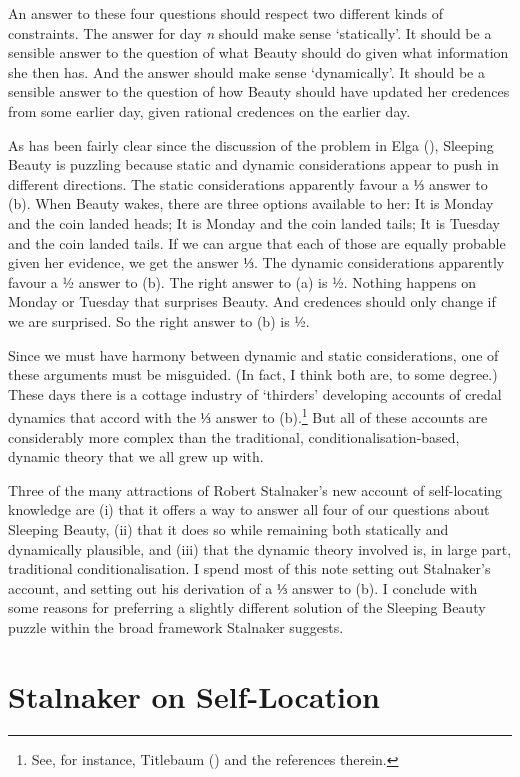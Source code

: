 \documentclass[
  10pt,
  letterpaper,
  DIV=11,
  numbers=noendperiod,
  twoside]{scrartcl}
\begin{document}
An answer to these four questions should respect two different kinds of
constraints. The answer for day \emph{n} should make sense `statically'.
It should be a sensible answer to the question of what Beauty should do
given what information she then has. And the answer should make sense
`dynamically'. It should be a sensible answer to the question of how
Beauty should have updated her credences from some earlier day, given
rational credences on the earlier day.

As has been fairly clear since the discussion of the problem in Elga
(), Sleeping Beauty is puzzling because
static and dynamic considerations appear to push in different
directions. The static considerations apparently favour a ⅓ answer to
(b). When Beauty wakes, there are three options available to her: It is
Monday and the coin landed heads; It is Monday and the coin landed
tails; It is Tuesday and the coin landed tails. If we can argue that
each of those are equally probable given her evidence, we get the answer
⅓. The dynamic considerations apparently favour a ½ answer to (b). The
right answer to (a) is ½. Nothing happens on Monday or Tuesday that
surprises Beauty. And credences should only change if we are surprised.
So the right answer to (b) is ½.

Since we must have harmony between dynamic and static considerations,
one of these arguments must be misguided. (In fact, I think both are, to
some degree.) These days there is a cottage industry of `thirders'
developing accounts of credal dynamics that accord with the ⅓ answer to
(b).\footnote{See, for instance, Titlebaum
  () and the references therein.} But
all of these accounts are considerably more complex than the
traditional, conditionalisation-based, dynamic theory that we all grew
up with.

Three of the many attractions of Robert Stalnaker's new account of
self-locating knowledge are (i) that it offers a way to answer all four
of our questions about Sleeping Beauty, (ii) that it does so while
remaining both statically and dynamically plausible, and (iii) that the
dynamic theory involved is, in large part, traditional
conditionalisation. I spend most of this note setting out Stalnaker's
account, and setting out his derivation of a ⅓ answer to (b). I conclude
with some reasons for preferring a slightly different solution of the
Sleeping Beauty puzzle within the broad framework Stalnaker suggests.

\section{Stalnaker on Self-Location}\label{stalnaker-on-self-location}
\end{document}
